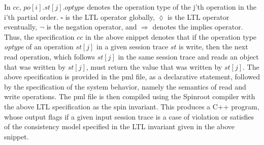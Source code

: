 \documentclass[conference]{IEEEtran}
\begin{document}
	In $\mathit{cc}$, $\mathit{po}[i]. \mathit{st}[j].\mathit{optype}$ denotes the operation type of the j'th operation in the i'th partial order. $\square$ is the LTL operator globally, $\lozenge$ is the LTL operator eventually, $\lnot$ is the negation operator, and   $\Rightarrow$ denotes the implies operator.  Thus, the specification $cc$ in  the above snippet %
	denotes that if the operation type \emph{optype} of an operation $st[j]$ in a given session trace $st$ is write, then the next read operation, which follows $st[j]$ in the same session trace and reads an  object that was written by $st[j]$, must return the value that was written by $st[j]$.
	The above specification is provided in the pml file, as a declarative statement, followed by the specification of the system behavior, namely the semantics of read and write operations. 
	The pml file is then compiled using the Spinroot compiler with the above LTL specification as the spin invariant. 
	This produces a C++ program, whose output flags if a given input session trace is a case of violation or satisfies of the consistency model specified in the LTL invariant given in  the above snippet. %
\end{document}
